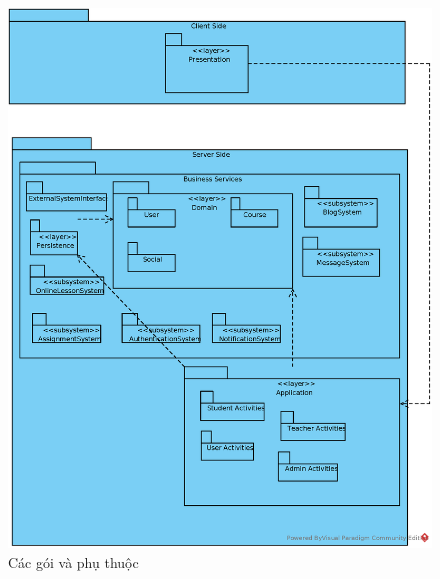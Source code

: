 \documentclass[./../main_file.tex]{subfiles}
\begin{document}
	\begin{figure}[H]
		\centering
		\includegraphics[width=\linewidth]{./images/packages_and_dependencies.eps}
		\caption{Các gói và phụ thuộc}
	\end{figure}
\end{document}
